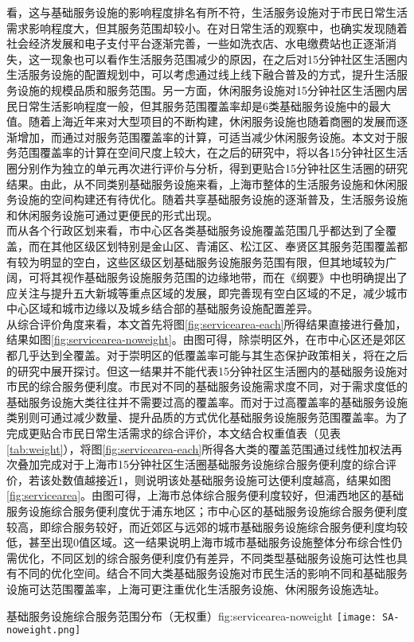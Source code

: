 \documentclass{shnuthesis}
\begin{document}
\noindent 看，这与基础服务设施的影响程度排名有所不符，生活服务设施对于市民日常生活需求影响程度大，但其服务范围却较小。在对日常生活的观察中，也确实发现随着社会经济发展和电子支付平台逐渐完善，一些如洗衣店、水电缴费站也正逐渐消失，这一现象也可以看作生活服务范围减少的原因，在之后对15分钟社区生活圈内生活服务设施的配置规划中，可以考虑通过线上线下融合普及的方式，提升生活服务设施的规模品质和服务范围。另一方面，休闲服务设施对15分钟社区生活圈内居民日常生活影响程度一般，但其服务范围覆盖率却是6类基础服务设施中的最大值。随着上海近年来对大型项目的不断构建，休闲服务设施也随着商圈的发展而逐渐增加，而通过对服务范围覆盖率的计算，可适当减少休闲服务设施。本文对于服务范围覆盖率的计算在空间尺度上较大，在之后的研究中，将以各15分钟社区生活圈分别作为独立的单元再次进行评价与分析，得到更贴合15分钟社区生活圈的研究结果。由此，从不同类别基础服务设施来看，上海市整体的生活服务设施和休闲服务设施的空间构建还有待优化。随着共享基础服务设施的逐渐普及，生活服务设施和休闲服务设施可通过更便民的形式出现。\\
\indent 而从各个行政区划来看，市中心区各类基础服务设施覆盖范围几乎都达到了全覆盖，而在其他区级区划特别是金山区、青浦区、松江区、奉贤区其服务范围覆盖都有较为明显的空白，这些区级区划基础服务设施服务范围有限，但其地域较为广阔，可将其视作基础服务设施服务范围的边缘地带，而在《纲要》中也明确提出了应关注与提升五大新城等重点区域的发展，即完善现有空白区域的不足，减少城市中心区域和城市边缘以及城乡结合部的基础服务设施配置差异。\\
\indent 从综合评价角度来看，本文首先将图\ref{fig:servicearea-each}所得结果直接进行叠加，结果如图\ref{fig:servicearea-noweight}。由图可得，除崇明区外，在市中心区还是郊区都几乎达到全覆盖。对于崇明区的低覆盖率可能与其生态保护政策相关，将在之后的研究中展开探讨。但这一结果并不能代表15分钟社区生活圈内的基础服务设施对市民的综合服务便利度。市民对不同的基础服务设施需求度不同，对于需求度低的基础服务设施大类往往并不需要过高的覆盖率。而对于过高覆盖率的基础服务设施类别则可通过减少数量、提升品质的方式优化基础服务设施服务范围覆盖率。为了完成更贴合市民日常生活需求的综合评价，本文结合权重值表（见表\ref{tab:weight}），将图\ref{fig:servicearea-each}所得各大类的覆盖范围通过线性加权法再次叠加完成对于上海市15分钟社区生活圈基础服务设施综合服务便利度的综合评价，若该处数值越接近1，则说明该处基础服务设施可达便利度越高，结果如图\ref{fig:servicearea}。由图可得，上海市总体综合服务便利度较好，但浦西地区的基础服务设施综合服务便利度优于浦东地区；市中心区的基础服务设施综合服务便利度较高，即综合服务较好，而近郊区与远郊的城市基础服务设施综合服务便利度均较低，甚至出现0值区域。这一结果说明上海市城市基础服务设施整体分布综合性仍需优化，不同区划的综合服务便利度仍有差异，不同类型基础服务设施可达性也具有不同的优化空间。结合不同大类基础服务设施对市民生活的影响不同和基础服务设施可达范围覆盖率，上海可更注重优化生活服务设施、休闲服务设施选址。
\begin{generalfig}[H]{基础服务设施综合服务范围分布（无权重）}{fig:servicearea-noweight}
	\texttt{[image: SA-noweight.png]}
\end{generalfig}
\end{document}
